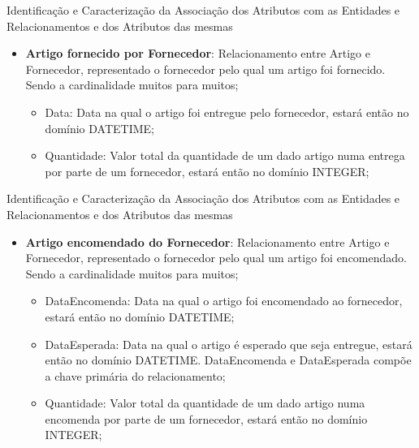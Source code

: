 \documentclass[compress,svgnames,handout,13.7pt]{beamer}
\begin{document}
\begin{frame}{Identificação e Caracterização da Associação dos Atributos com as Entidades e Relacionamentos e dos Atributos das mesmas}
\begin{itemize}
                 \item{\textbf{Artigo fornecido por Fornecedor}:} Relacionamento entre Artigo e Fornecedor, representado o fornecedor pelo qual um artigo foi fornecido. Sendo a cardinalidade muitos para muitos;
                     \begin{itemize}
                     \item{Data:} Data na qual o artigo foi entregue pelo fornecedor, estará então no domínio DATETIME;
                     \item{Quantidade:} Valor total da quantidade de um dado artigo numa entrega por parte de um fornecedor, estará então no domínio INTEGER;
                       
                     \end{itemize}
\end{itemize}
\end{frame}
\begin{frame}{Identificação e Caracterização da Associação dos Atributos com as Entidades e Relacionamentos e dos Atributos das mesmas}
\begin{itemize}
                 \item{\textbf{Artigo encomendado do Fornecedor}:} Relacionamento entre Artigo e Fornecedor, representado o fornecedor pelo qual um artigo foi encomendado. Sendo a cardinalidade muitos para muitos;
                     \begin{itemize}
                     \item{DataEncomenda:} Data na qual o artigo foi encomendado ao fornecedor, estará então no domínio DATETIME;
                     \item{DataEsperada:} Data na qual o artigo é esperado que seja entregue, estará então no domínio DATETIME. DataEncomenda e DataEsperada compõe a chave primária do relacionamento;
                     \item{Quantidade:} Valor total da quantidade de um dado artigo numa encomenda por parte de um fornecedor, estará então no domínio INTEGER;
                       
                     \end{itemize}
\end{itemize}
\end{frame}
\end{document}
